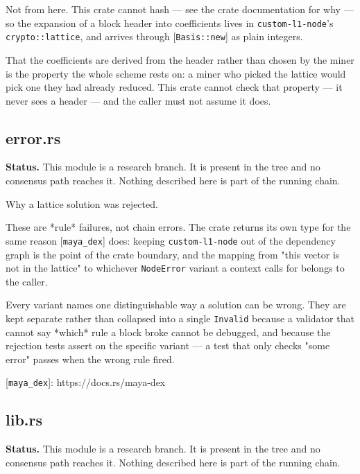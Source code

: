 \documentclass[11pt,a4paper]{article}
\begin{document}
Not from here. This crate cannot hash — see the crate documentation for why
— so the expansion of a block header into coefficients lives in
\texttt{custom-l1-node}'s \texttt{crypto::lattice}, and arrives through
[\texttt{Basis::new}] as plain integers.

That the coefficients are derived from the header rather than chosen by the
miner is the property the whole scheme rests on: a miner who picked the
lattice would pick one they had already reduced. This crate cannot check
that property — it never sees a header — and the caller must not assume it
does.

\subsection{error.rs}
\begin{framed}\noindent\textbf{Status.} This module is a research branch. It is present in the tree and no consensus path reaches it. Nothing described here is part of the running chain.\end{framed}

Why a lattice solution was rejected.

These are *rule* failures, not chain errors. The crate returns its own type
for the same reason [\texttt{maya\_dex}] does: keeping \texttt{custom-l1-node} out of the
dependency graph is the point of the crate boundary, and the mapping from
"this vector is not in the lattice" to whichever \texttt{NodeError} variant a
context calls for belongs to the caller.

Every variant names one distinguishable way a solution can be wrong. They
are kept separate rather than collapsed into a single \texttt{Invalid} because a
validator that cannot say *which* rule a block broke cannot be debugged, and
because the rejection tests assert on the specific variant — a test that
only checks "some error" passes when the wrong rule fired.

[\texttt{maya\_dex}]: https://docs.rs/maya-dex

\subsection{lib.rs}
\begin{framed}\noindent\textbf{Status.} This module is a research branch. It is present in the tree and no consensus path reaches it. Nothing described here is part of the running chain.\end{framed}
\end{document}
